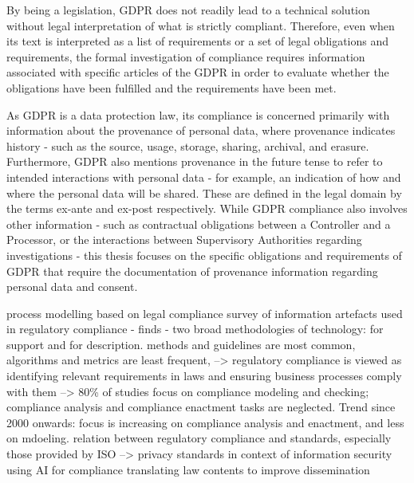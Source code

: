 By being a legislation, GDPR does not readily lead to a technical solution without legal interpretation of what is strictly compliant. Therefore, even when its text is interpreted as a list of requirements or a set of legal obligations and requirements, the formal investigation of compliance requires information associated with specific articles of the GDPR in order to evaluate whether the obligations have been fulfilled and the requirements have been met.

As GDPR is a data protection law, its compliance is concerned primarily with information about the provenance of personal data, where provenance indicates history - such as the source, usage, storage, sharing, archival, and erasure. Furthermore, GDPR also mentions provenance in the future tense to refer to intended interactions with personal data - for example, an indication of how and where the personal data will be shared. These are defined in the legal domain by the terms ex-ante and ex-post respectively.
While GDPR compliance also involves other information - such as contractual obligations between a Controller and a Processor, or the interactions between Supervisory Authorities regarding investigations - this thesis focuses on the specific obligations and requirements of GDPR that require the documentation of provenance information regarding personal data and consent.


\cite{casanovas_european_2016}

\cite{sadiq_modeling_2007} process modelling based on legal compliance
\cite{benyoucef_information_2015} survey of information artefacts used in regulatory compliance - finds - two broad methodologies of technology: for support and for description. methods and guidelines are most common, algorithms and metrics are least frequent, --> regulatory compliance is viewed as identifying relevant requirements in laws and ensuring business processes comply with them --> 80\% of studies focus on compliance modeling and checking; compliance analysis and compliance enactment tasks are neglected. Trend since 2000 onwards: focus is increasing on compliance analysis and enactment, and less on mdoeling.
\cite{drogkaris_guidance_2018} relation between regulatory compliance and standards, especially those provided by ISO --> privacy standards in context of information security
\cite{kingston_using_2017} using AI for compliance
\cite{mommers_understanding_2009} translating law contents to improve dissemination



